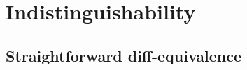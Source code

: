 \section{Indistinguishability}

 \newcommand{\pair}[1]{\langle #1 \rangle}



 \newcommand{\fold}{\mathsf{fold}}




\subsection{Straightforward diff-equivalence}


